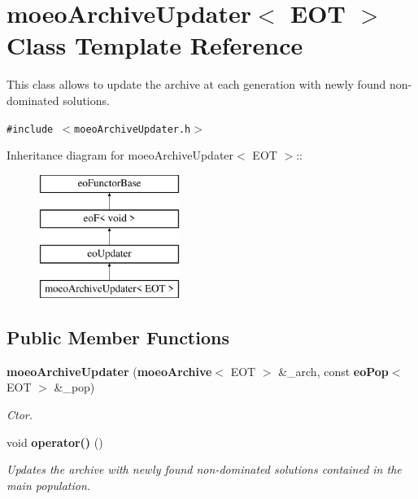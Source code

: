 \section{moeo\-Archive\-Updater$<$ EOT $>$ Class Template Reference}
\label{classmoeoArchiveUpdater}
This class allows to update the archive at each generation with newly found non-dominated solutions.  


{\tt \#include $<$moeo\-Archive\-Updater.h$>$}

Inheritance diagram for moeo\-Archive\-Updater$<$ EOT $>$::\begin{figure}[H]
\begin{center}
\leavevmode
\includegraphics[height=4cm]{classmoeoArchiveUpdater}
\end{center}
\end{figure}
\subsection*{Public Member Functions}
\begin{CompactItemize}
\item 
{\bf moeo\-Archive\-Updater} ({\bf moeo\-Archive}$<$ EOT $>$ \&\_\-arch, const {\bf eo\-Pop}$<$ EOT $>$ \&\_\-pop)
\begin{CompactList}\small\item\em Ctor. \item\end{CompactList}\item 
void {\bf operator()} ()\label{classmoeoArchiveUpdater_19e98244f0dd641983af81d8dcaf0f7d}

\begin{CompactList}\small\item\em Updates the archive with newly found non-dominated solutions contained in the main population. \item\end{CompactList}\end{CompactItemize}
